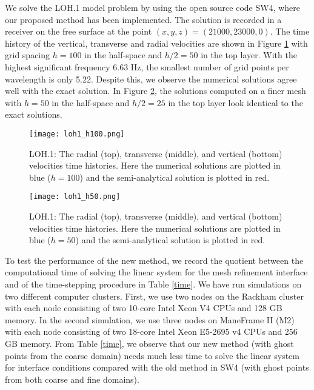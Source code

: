 We solve the LOH.1 model problem by using the open source code SW4, where our proposed method has been implemented. The solution is recorded in a receiver on the free surface at the point $(x, y, z) = (21000, 23000, 0)$. The time history of the vertical, transverse and radial velocities are shown in Figure \ref{loh1_100} with grid spacing $h = 100$ in the half-space and $h/2 = 50$ in the top layer. With the highest significant frequency 6.63 Hz, the smallest number of grid points per wavelength is only 5.22. Despite this, we observe  the numerical solutions agree well with the exact solution. In Figure \ref{loh1_50}, the solutions computed on a finer mesh with $h = 50$ in the half-space and $h/2 = 25$ in the top layer look identical to the exact solutions.
\begin{figure}[htbp]
	\centering
	\texttt{[image: loh1\_h100.png]}
	\caption{LOH.1: The radial (top), transverse (middle), and vertical (bottom) velocities time histories. Here the numerical solutions are plotted in blue ($h = 100$) and the semi-analytical solution is plotted in red.}\label{loh1_100}
\end{figure}

\begin{figure}[htbp]
	\centering
	\texttt{[image: loh1\_h50.png]}
	\caption{LOH.1: The radial (top), transverse (middle), and vertical (bottom) velocities time histories. Here the numerical solutions are plotted in blue ($h = 50$) and the semi-analytical solution is plotted in red.}\label{loh1_50}
\end{figure}

To test the performance of the new method, we record the quotient between the computational time of solving the linear system for the mesh refinement interface and of the time-stepping procedure in Table \ref{time}. We have run simulations on two different computer clusters. First, we use two nodes on the Rackham cluster with each node consisting of two 10-core Intel Xeon V4 CPUs and 128 GB memory. In the second simulation, we use three nodes on ManeFrame II (M2) with each node consisting of two 18-core Intel Xeon E5-2695 v4 CPUs and 256 GB memory. From Table \ref{time}, we observe that our new method (with ghost points from the coarse domain) needs much less time to solve the linear system for interface conditions compared with the old method in SW4 (with ghost points from both coarse and fine domains). 

